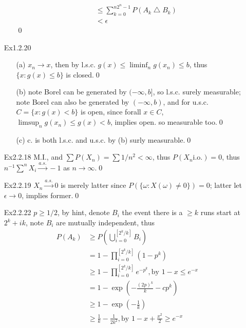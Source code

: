 \documentclass[paper=a4, fontsize=11pt]{scrartcl} %
\numberwithin{equation}{section} %
\numberwithin{figure}{section} %
\numberwithin{table}{section} %
\begin{document}
\begin{itemize}
\begin{itemize}
\begin{align}
	 			& \leq \sum_{k=0}^{n2^n-1} P(A_k\bigtriangleup B_k)\\
	 			& <\epsilon
	 	\end{align}\qed
	 \end{itemize}
	 \item[Ex1.2.20]
	 \begin{itemize}
	 	\item[(a)] $x_n\rightarrow x$, then by l.s.c. $g(x)\leq \liminf_n g(x_n)\leq b$, thus $\{x:g(x)\leq b\}$ is closed.\qed
	 	\item[(b)] note Borel can be generated by $(-\infty,b]$, so l.s.c. surely measurable; note Borel can also be generated by $(-\infty,b)$, and for u.s.c. $C=\{x:g(x)<b\}$ is open, since forall $x\in C$, $\limsup_n g(x_n) \leq g(x)<b$, implies open. so measurable too.\qed
	 	\item[(c)] c. is both l.s.c. and u.s.c. by (b) surly measurable.\qed
	 \end{itemize}
	\item[Ex2.2.18] M.I., and $\sum P(X_n)= \sum 1/n^2 < \infty$, thus $P(X_n \text{i.o.})=0$, thus $n^{-1}\sum^n X_i \stackrel{a.s.}{\rightarrow} -1$ as $n\rightarrow \infty$.\qed
	\item[Ex2.2.19] $X_n \stackrel{a.s.}{\rightarrow} 0$ is merely latter since $P(\{\omega:X(\omega)\neq 0\})=0$; latter let $\epsilon\rightarrow 0$, implies former.\qed
	\item[Ex2.2.22] $p\geq 1/2$, by hint, denote $B_i$ the event there is a $\geq k$ runs start at $2^k +ik$, note $B_i$ are mutually independent, thus
	\begin{align}
		P(A_k) &\geq P(\bigcup_{i=0}^{[2^k/k]} B_i)\\
			&= 1 - \prod_{i=0}^{[2^k/k]} (1-p^k)\\
			&\geq 1 - \prod_{i=0}^{[2^k/k]} e^{-p^k}, \text{by $1-x\leq e^{-x}$}\\
			&= 1 - \exp(- \frac{(2p)^k}{k} - cp^k)\\
			&\geq 1 - \exp(-\frac{1}{k})\\
			&\geq \frac{1}{k} - \frac{1}{2k^2}, \text{by $1-x+\frac{x^2}{2}\geq e^{-x}$}

\end{align}
\end{itemize}
\end{document}
